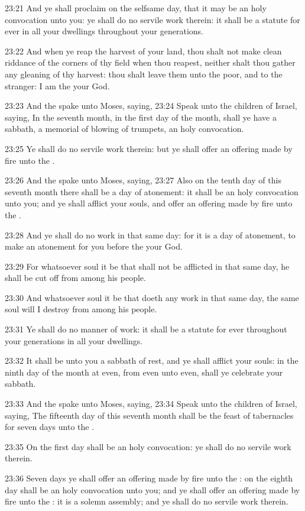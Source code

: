 23:21 And ye shall proclaim on the selfsame day, that it may be an
holy convocation unto you: ye shall do no servile work therein: it
shall be a statute for ever in all your dwellings throughout your
generations.

23:22 And when ye reap the harvest of your land, thou shalt not make
clean riddance of the corners of thy field when thou reapest, neither
shalt thou gather any gleaning of thy harvest: thou shalt leave them
unto the poor, and to the stranger: I am the \LORD your God.

23:23 And the \LORD spake unto Moses, saying, 23:24 Speak unto the
children of Israel, saying, In the seventh month, in the first day of
the month, shall ye have a sabbath, a memorial of blowing of trumpets,
an holy convocation.

23:25 Ye shall do no servile work therein: but ye shall offer an
offering made by fire unto the \LORD.

23:26 And the \LORD spake unto Moses, saying, 23:27 Also on the tenth
day of this seventh month there shall be a day of atonement: it shall
be an holy convocation unto you; and ye shall afflict your souls, and
offer an offering made by fire unto the \LORD.

23:28 And ye shall do no work in that same day: for it is a day of
atonement, to make an atonement for you before the \LORD your God.

23:29 For whatsoever soul it be that shall not be afflicted in that
same day, he shall be cut off from among his people.

23:30 And whatsoever soul it be that doeth any work in that same day,
the same soul will I destroy from among his people.

23:31 Ye shall do no manner of work: it shall be a statute for ever
throughout your generations in all your dwellings.

23:32 It shall be unto you a sabbath of rest, and ye shall afflict
your souls: in the ninth day of the month at even, from even unto
even, shall ye celebrate your sabbath.

23:33 And the \LORD spake unto Moses, saying, 23:34 Speak unto the
children of Israel, saying, The fifteenth day of this seventh month
shall be the feast of tabernacles for seven days unto the \LORD.

23:35 On the first day shall be an holy convocation: ye shall do no
servile work therein.

23:36 Seven days ye shall offer an offering made by fire unto the
\LORD: on the eighth day shall be an holy convocation unto you; and ye
shall offer an offering made by fire unto the \LORD: it is a solemn
assembly; and ye shall do no servile work therein.

